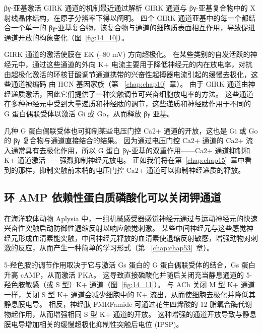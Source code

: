 βγ-亚基激活 GIRK 通道的机制最近通过解析 GIRK 通道与 βγ-亚基复合物中的 X 射线晶体结构，在原子分辨率下得以阐明。
四个 GIRK 通道亚基中的每一个都结合一个单一的 βγ-亚基复合物，该复合物与通道的细胞质表面相互作用，导致促进通道开放的构象变化（图~\ref{fig:14_10}）。


GIRK 通道的激活使膜在 EK (–80 mV) 方向超极化。 
在某些类别的自发活跃的神经元中，通过这些通道的外向 K+ 电流主要用于降低神经元的内在放电率，对抗由超极化激活的环核苷酸调节通道携带的兴奋性起搏器电流引起的缓慢去极化，这些通道被编码 由 HCN 基因家族（第 ~\ref{chap:chap10}~章）。
由于 GIRK 通道由神经递质激活，因此它们提供了一种突触调节可兴奋细胞放电率的方法。
这些通道在多种神经元中受到大量递质和神经肽的调节，这些递质和神经肽作用于不同的 G 蛋白偶联受体以激活 Gi 或 Go，从而释放 βγ 亚基。


几种 G 蛋白偶联受体也可抑制某些电压门控 Ca2+ 通道的开放，这也是 Gi 或 Go 的 βγ 复合物与通道直接结合的结果。
因为通过电压门控 Ca2+ 通道的 Ca2+ 流入通常具有去极化作用，所以 G 蛋白 βγ-亚基的双重作用——Ca2+ 通道抑制和 K+ 通道激活——强烈抑制神经元放电。
正如我们将在第~\ref{chap:chap15}~章中看到的那样，抑制突触前末梢的电压门控 Ca2+ 通道可以抑制神经递质的释放。



\subsection{环 AMP 依赖性蛋白质磷酸化可以关闭钾通道}

在海洋软体动物 Aplysia 中，一组机械感受器感觉神经元通过与运动神经元的快速兴奋性突触启动防御性退缩反射以响应触觉刺激。
某些中间神经元与这些感觉神经元形成血清素能突触，中间神经元释放的血清素使退缩反射敏感，增强动物对刺激的反应，从而产生一种简单的学习形式（第 ~\ref{chap:chap53}~章）。


5-羟色胺的调节作用取决于它与激活 Gs 蛋白的 G 蛋白偶联受体的结合，Gs 蛋白升高 cAMP，从而激活 PKA。
这导致直接磷酸化并随后关闭充当静息通道的 5-羟色胺敏感（或 S 型）K+ 通道（图~\ref{fig:14_11}）。
与 ACh 关闭 M 型 K+ 通道一样，关闭 S 型 K+ 通道会减少细胞中的 K+ 流出，从而使细胞去极化并降低其静息膜电导。
相反，神经肽 FMRFamide 可通过花生四烯酸的 12-脂氧合酶代谢物起作用，从而增强相同 S 型 K+ 通道的开放。
这种增强的通道开放导致与静息膜电导增加相关的缓慢超极化抑制性突触后电位 (IPSP)。


